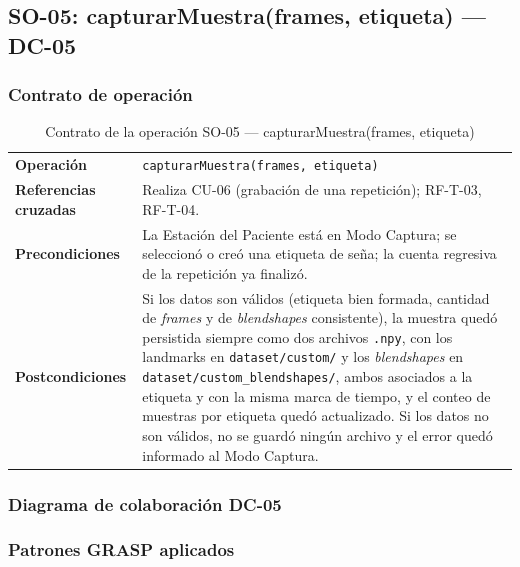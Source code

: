 \subsection{SO-05: capturarMuestra(frames, etiqueta) --- DC-05}

\subsubsection{Contrato de operación}

\begin{table}[H]
\centering
\begin{tabularx}{\textwidth}{@{}p{4.4cm} X@{}}
\toprule
\textbf{Operación} & \texttt{capturarMuestra(frames, etiqueta)} \\
\textbf{Referencias cruzadas} & Realiza CU-06 (grabación de una repetición);
RF-T-03, RF-T-04. \\
\textbf{Precondiciones} & La Estación del Paciente está en Modo Captura; se
seleccionó o creó una etiqueta de seña; la cuenta regresiva de la repetición
ya finalizó. \\
\textbf{Postcondiciones} & Si los datos son válidos (etiqueta bien formada,
cantidad de \textit{frames} y de \textit{blendshapes} consistente), la
muestra quedó persistida siempre como dos archivos \texttt{.npy}, con los
landmarks en \texttt{dataset/custom/} y los \textit{blendshapes} en
\texttt{dataset/custom\_blendshapes/}, ambos asociados a la etiqueta y con la
misma marca de tiempo, y el conteo de muestras por etiqueta quedó actualizado. Si los
datos no son válidos, no se guardó ningún archivo y el error quedó
informado al Modo Captura. \\
\bottomrule
\end{tabularx}
\caption{Contrato de la operación SO-05 --- capturarMuestra(frames, etiqueta)}
\label{tab:col-contrato-so05}
\end{table}

\subsubsection{Diagrama de colaboración DC-05}


\subsubsection{Patrones GRASP aplicados}

